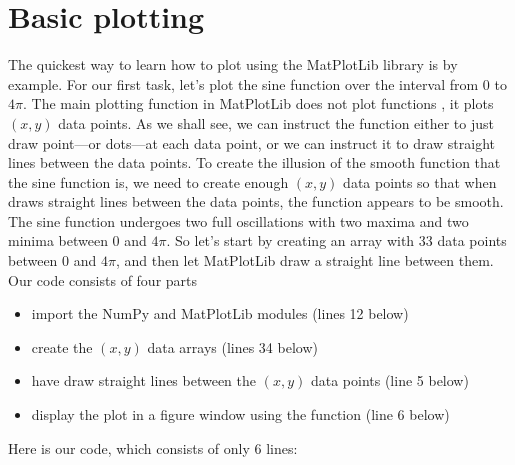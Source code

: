 \documentclass[letterpaper,10pt,english]{sphinxmanual}
\begin{document}
\section{Basic plotting}
\label{\detokenize{chap5/chap5_plot:basic-plotting}}\label{\detokenize{chap5/chap5_plot:chap5basicplotting}}
\ignorespaces 
\sphinxAtStartPar
The quickest way to learn how to plot using the MatPlotLib library is by example.  For our first task, let’s plot the sine function over the interval from 0 to \(4\pi\).  The main plotting function  in MatPlotLib does not plot functions , it plots \((x,y)\) data points.  As we shall see, we can instruct the function  either to just draw point—or dots—at each data point, or we can instruct it to draw straight lines between the data points.  To create the illusion of the smooth function that the sine function is, we need to create enough \((x,y)\) data points so that when  draws straight lines between the data points, the function appears to be smooth.  The sine function undergoes two full oscillations with two maxima and two minima between 0 and \(4\pi\).  So let’s start by creating an array with 33 data points between 0 and \(4\pi\), and then let MatPlotLib draw a straight line between them.  Our code consists of four parts
\begin{itemize}
\item {} 
\sphinxAtStartPar
import the NumPy and MatPlotLib modules (lines 1\sphinxhyphen{}2 below)

\item {} 
\sphinxAtStartPar
create the \((x,y)\) data arrays (lines 3\sphinxhyphen{}4 below)

\item {} 
\sphinxAtStartPar
have  draw straight lines between the \((x,y)\) data points (line 5 below)

\item {} 
\sphinxAtStartPar
display the plot in a figure window using the  function (line 6 below)

\end{itemize}

\sphinxAtStartPar
Here is our code, which consists of only 6 lines:

\begin{sphinxVerbatim}[commandchars=\\\{\},numbers=left,firstnumber=1,stepnumber=1]
   
   
    
  
 
\end{sphinxVerbatim}
\end{document}
